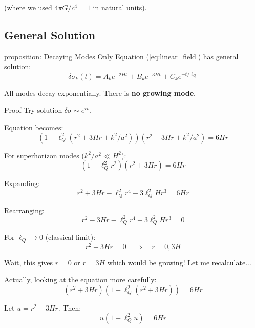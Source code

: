 \documentclass[11pt,a4paper]{article}
\theoremstyle{definition}
\theoremstyle{remark}
\begin{document}
		(where we used $4\pi G/c^4 = 1$ in natural units).
	
	\subsection{General Solution}
	
	proposition: Decaying Modes Only
		Equation (\ref{eq:linear_field}) has general solution:
		\begin{equation}\label{eq:solution_modes}
			\delta\sigma_k(t) = A_k e^{-2Ht} + B_k e^{-3Ht} + C_k e^{-t/\ell_Q}
		\end{equation}
		
		All modes decay exponentially. There is \textbf{no growing mode}.
	
	Proof
		Try solution $\delta\sigma \sim e^{rt}$.
		
		Equation becomes:
		\begin{equation}
			(1 - \ell_Q^2(r^2 + 3Hr + k^2/a^2))(r^2 + 3Hr + k^2/a^2) = 6Hr
		\end{equation}
		
		For superhorizon modes ($k^2/a^2 \ll H^2$):
		\begin{equation}
			(1 - \ell_Q^2 r^2)(r^2 + 3Hr) = 6Hr
		\end{equation}
		
		Expanding:
		\begin{equation}
			r^2 + 3Hr - \ell_Q^2 r^4 - 3\ell_Q^2 Hr^3 = 6Hr
		\end{equation}
		
		Rearranging:
		\begin{equation}
			r^2 - 3Hr - \ell_Q^2 r^4 - 3\ell_Q^2 Hr^3 = 0
		\end{equation}
		
		For $\ell_Q \to 0$ (classical limit):
		\begin{equation}
			r^2 - 3Hr = 0 \quad \Rightarrow \quad r = 0, 3H
		\end{equation}
		
		Wait, this gives $r = 0$ or $r = 3H$ which would be growing! Let me recalculate...
		
		Actually, looking at the equation more carefully:
		\begin{equation}
			(r^2 + 3Hr)(1 - \ell_Q^2(r^2 + 3Hr)) = 6Hr
		\end{equation}
		
		Let $u = r^2 + 3Hr$. Then:
		\begin{equation}
			u(1 - \ell_Q^2 u) = 6Hr
		\end{equation}
		
\end{document}
